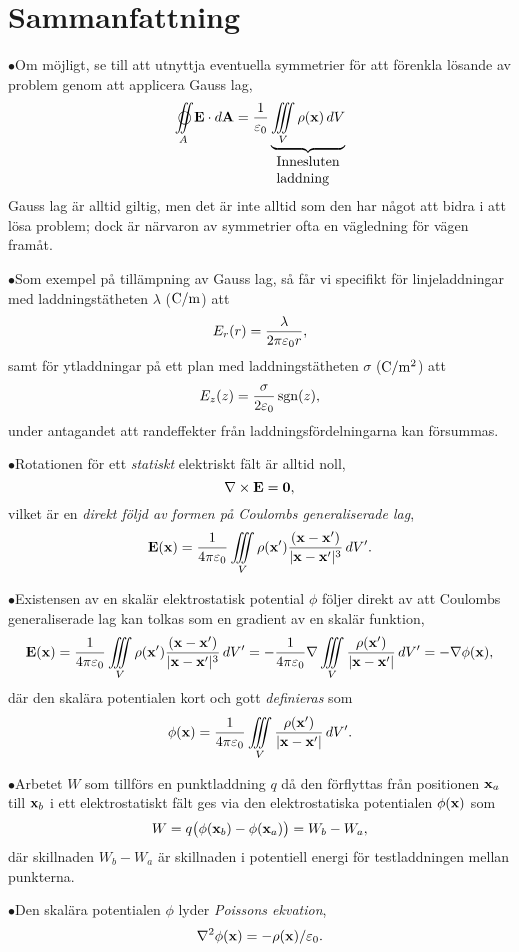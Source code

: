 \section{Sammanfattning}
\item{$\bullet$}{Om m{\"o}jligt, se till att utnyttja eventuella symmetrier f{\"o}r att f{\"o}renkla l{\"o}sande av problem genom att applicera Gauss lag,
$$
  \oiint_A {\bf E}\cdot d{\bf A}
     ={{1}\over{\varepsilon_0}}
       \underbrace{
         \iiint_V\rho({\bf x})\,dV
       }_{\vbox{\hbox{Innesluten}\hbox{laddning}}}
$$
Gauss lag {\"a}r alltid giltig, men det {\"a}r inte alltid som den har n{\aa}got att bidra i att l{\"o}sa problem; dock {\"a}r n{\"a}rvaron av symmetrier ofta en v{\"a}gledning f{\"o}r v{\"a}gen fram{\aa}t.}
\item{$\bullet$}{Som exempel p{\aa} till{\"a}mpning av Gauss lag, s{\aa} f{\aa}r vi specifikt f{\"o}r linjeladdningar med laddnings\-t{\"a}t\-heten $\lambda$ (${\rm C}/{\rm m}$) att
$$
  E_r(r)={{\lambda}\over{2\pi\varepsilon_0 r}},
$$
samt f{\"o}r ytladdningar p{\aa} ett plan med laddningst{\"a}theten $\sigma$ (${\rm C}/{\rm m}^2$) att
$$
  E_z(z)={{\sigma}\over{2\varepsilon_0}}\sgn(z),
$$
under antagandet att randeffekter fr{\aa}n laddningsf{\"o}rdelningarna kan f{\"o}rsummas.}
\item{$\bullet$}{Rotationen f{\"o}r ett {\it statiskt} elektriskt f{\"a}lt {\"a}r alltid noll,
$$
  \nabla\times{\bf E}={\bf 0},
$$
vilket {\"a}r en {\it direkt f{\"o}ljd av formen p{\aa} Coulombs generaliserade lag},
$$
  {\bf E}({\bf x})
    ={{1}\over{4\pi\varepsilon_0}}\iiint_V\rho({\bf x}')
      {{({\bf x}-{\bf x}')}\over{|{\bf x}-{\bf x}'|^3}}\,dV'.
$$
}
\item{$\bullet$}{Existensen av en skal{\"a}r elektrostatisk potential $\phi$ f{\"o}ljer direkt av att Coulombs generaliserade lag kan tolkas som en gradient av en skal{\"a}r funktion,
$$
  {\bf E}({\bf x})
    ={{1}\over{4\pi\varepsilon_0}}\iiint_V\rho({\bf x}')
      {{({\bf x}-{\bf x}')}\over{|{\bf x}-{\bf x}'|^3}}\,dV'
    =-{{1}\over{4\pi\varepsilon_0}}\nabla\iiint_V
      {{\rho({\bf x}')}\over{|{\bf x}-{\bf x}'|}}\,dV'
    =-\nabla\phi({\bf x}),
$$
d{\"a}r den skal{\"a}ra potentialen kort och gott {\it definieras} som
$$
  \phi({\bf x})={{1}\over{4\pi\varepsilon_0}}\iiint_V
      {{\rho({\bf x}')}\over{|{\bf x}-{\bf x}'|}}\,dV'.
$$}
\item{$\bullet$}{Arbetet $W$ som tillf{\"o}rs en punktladdning $q$ d{\aa} den f{\"o}rflyttas fr{\aa}n positionen ${\bf x}_a$ till ${\bf x}_b$ i ett elektrostatiskt f{\"a}lt ges via den elektrostatiska potentialen $\phi({\bf x})$ som
$$
  W=q\big(\phi({{\bf x}_b})-\phi({{\bf x}_a})\big)=W_b-W_a,
$$
d{\"a}r skillnaden $W_b-W_a$ {\"a}r skillnaden i potentiell energi f{\"o}r testladdningen mellan punkterna.}
\item{$\bullet$}{Den skal{\"a}ra potentialen $\phi$ lyder {\it Poissons ekvation},
$$
  \nabla^2\phi({\bf x})=-\rho({\bf x})/\varepsilon_0.
$$
}
\bye
